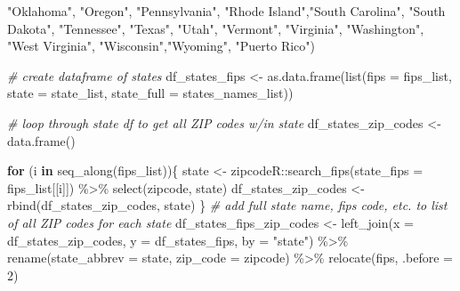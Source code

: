 \documentclass[
  11 pt,
  openany]{book}
\newenvironment{Shaded}{\begin{snugshade}}{\end{snugshade}}
\newcommand{\AttributeTok}[1]{\textcolor[rgb]{0.77,0.63,0.00}{#1}}
\newcommand{\CommentTok}[1]{\textcolor[rgb]{0.56,0.35,0.01}{\textit{#1}}}
\newcommand{\ControlFlowTok}[1]{\textcolor[rgb]{0.13,0.29,0.53}{\textbf{#1}}}
\newcommand{\DecValTok}[1]{\textcolor[rgb]{0.00,0.00,0.81}{#1}}
\newcommand{\FunctionTok}[1]{\textcolor[rgb]{0.00,0.00,0.00}{#1}}
\newcommand{\NormalTok}[1]{#1}
\newcommand{\OtherTok}[1]{\textcolor[rgb]{0.56,0.35,0.01}{#1}}
\newcommand{\SpecialCharTok}[1]{\textcolor[rgb]{0.00,0.00,0.00}{#1}}
\newcommand{\StringTok}[1]{\textcolor[rgb]{0.31,0.60,0.02}{#1}}
\begin{document}
\begin{Shaded}
\begin{Highlighting}[]
    \StringTok{"Oklahoma"}\NormalTok{, }\StringTok{"Oregon"}\NormalTok{, }\StringTok{"Pennsylvania"}\NormalTok{, }\StringTok{"Rhode Island"}\NormalTok{,}\StringTok{"South Carolina"}\NormalTok{, }
    \StringTok{"South Dakota"}\NormalTok{, }\StringTok{"Tennessee"}\NormalTok{, }\StringTok{"Texas"}\NormalTok{, }\StringTok{"Utah"}\NormalTok{, }\StringTok{"Vermont"}\NormalTok{, }\StringTok{"Virginia"}\NormalTok{, }
    \StringTok{"Washington"}\NormalTok{, }\StringTok{"West Virginia"}\NormalTok{, }\StringTok{"Wisconsin"}\NormalTok{,}\StringTok{"Wyoming"}\NormalTok{, }\StringTok{"Puerto Rico"}\NormalTok{)}

\CommentTok{\# create dataframe of states}
\NormalTok{df\_states\_fips }\OtherTok{\textless{}{-}} \FunctionTok{as.data.frame}\NormalTok{(}\FunctionTok{list}\NormalTok{(}\AttributeTok{fips =}\NormalTok{ fips\_list,}
                                     \AttributeTok{state =}\NormalTok{ state\_list,}
                                     \AttributeTok{state\_full =}\NormalTok{ states\_names\_list))}

\CommentTok{\# loop through state df to get all ZIP codes w/in state}
\NormalTok{df\_states\_zip\_codes }\OtherTok{\textless{}{-}} \FunctionTok{data.frame}\NormalTok{()}

\ControlFlowTok{for}\NormalTok{ (i }\ControlFlowTok{in} \FunctionTok{seq\_along}\NormalTok{(fips\_list))\{}
\NormalTok{  state }\OtherTok{\textless{}{-}}\NormalTok{ zipcodeR}\SpecialCharTok{::}\FunctionTok{search\_fips}\NormalTok{(}\AttributeTok{state\_fips =}\NormalTok{ fips\_list[[i]]) }\SpecialCharTok{\%\textgreater{}\%} 
    \FunctionTok{select}\NormalTok{(zipcode, state)}
\NormalTok{  df\_states\_zip\_codes }\OtherTok{\textless{}{-}} \FunctionTok{rbind}\NormalTok{(df\_states\_zip\_codes, state)}
\NormalTok{\}}
\CommentTok{\# add full state name, fips code, etc. to list of all ZIP codes for each state}
\NormalTok{df\_states\_fips\_zip\_codes }\OtherTok{\textless{}{-}} 
  \FunctionTok{left\_join}\NormalTok{(}\AttributeTok{x =}\NormalTok{ df\_states\_zip\_codes,}
            \AttributeTok{y =}\NormalTok{ df\_states\_fips,}
            \AttributeTok{by =} \StringTok{"state"}\NormalTok{) }\SpecialCharTok{\%\textgreater{}\%} 
  \FunctionTok{rename}\NormalTok{(}\AttributeTok{state\_abbrev =}\NormalTok{ state,}
         \AttributeTok{zip\_code =}\NormalTok{ zipcode) }\SpecialCharTok{\%\textgreater{}\%} 
  \FunctionTok{relocate}\NormalTok{(fips, }\AttributeTok{.before =} \DecValTok{2}\NormalTok{)}



\end{Highlighting}
\end{Shaded}
\end{document}
